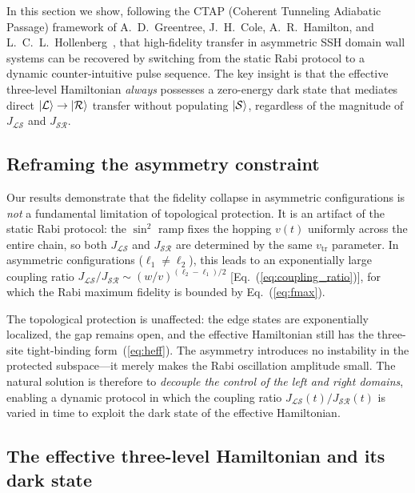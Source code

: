 \documentclass[
  reprint,
  amsmath,
  amssymb,
  aps,
  prb,
  floatfix,
  longbibliography,
]{revtex4-2}
\newcommand{\JLS}{J_{\mathcal{LS}}}
\newcommand{\JSR}{J_{\mathcal{SR}}}
\newcommand{\ketL}{\ket{\mathcal{L}}}
\newcommand{\ketS}{\ket{\mathcal{S}}}
\newcommand{\ketR}{\ket{\mathcal{R}}}
\begin{document}
In this section we show, following the CTAP (Coherent Tunneling Adiabatic
Passage) framework of A.~D.~Greentree, J.~H.~Cole, A.~R.~Hamilton, and
L.~C.~L.~Hollenberg~\cite{Greentree2004}, that high-fidelity transfer in
asymmetric SSH domain wall systems can be recovered by switching from the
static Rabi protocol to a dynamic counter-intuitive pulse sequence. The key
insight is that the effective three-level Hamiltonian \emph{always} possesses
a zero-energy dark state that mediates direct $\ketL \to \ketR$ transfer
without populating $\ketS$, regardless of the magnitude of $\JLS$ and $\JSR$.

\subsection{Reframing the asymmetry constraint}
\label{sec:ctap_reframing}

Our results demonstrate that the fidelity collapse in asymmetric configurations
is \emph{not} a fundamental limitation of topological protection. It is an
artifact of the static Rabi protocol: the $\sin^2$ ramp fixes the hopping
$v(t)$ uniformly across the entire chain, so both $\JLS$ and $\JSR$ are
determined by the same $v_{\mathrm{tr}}$ parameter. In asymmetric configurations
($\ell_1 \neq \ell_2$), this leads to an exponentially large coupling ratio
$\JLS/\JSR \sim (w/v)^{(\ell_2-\ell_1)/2}$ [Eq.~(\ref{eq:coupling_ratio})],
for which the Rabi maximum fidelity is bounded by Eq.~(\ref{eq:fmax}).

The topological protection is unaffected: the edge states are exponentially
localized, the gap remains open, and the effective Hamiltonian still has the
three-site tight-binding form~(\ref{eq:heff}). The asymmetry introduces no
instability in the protected subspace---it merely makes the Rabi oscillation
amplitude small. The natural solution is therefore to \emph{decouple the control
of the left and right domains}, enabling a dynamic protocol in which the
coupling ratio $\JLS(t)/\JSR(t)$ is varied in time to exploit the dark state
of the effective Hamiltonian.

\subsection{The effective three-level Hamiltonian and its dark state}
\label{sec:ctap_darkstate}
\end{document}
